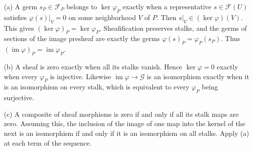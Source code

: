 (a) A germ $s_P\in\mathscr F_P$ belongs to $\ker\varphi_P$ exactly when a representative $s\in\mathscr F(U)$ satisfies $\varphi(s)|_V=0$ on some neighborhood $V$ of $P$. Then $s|_V\in(\ker\varphi)(V)$. This gives $(\ker\varphi)_P=\ker\varphi_P$. Sheafification preserves stalks, and the germs of sections of the image presheaf are exactly the germs $\varphi(s)_P=\varphi_P(s_P)$. Thus $(\operatorname{im}\varphi)_P=\operatorname{im}\varphi_P$.

(b) A sheaf is zero exactly when all its stalks vanish. Hence $\ker\varphi=0$ exactly when every $\varphi_P$ is injective. Likewise $\operatorname{im}\varphi\to\mathscr G$ is an isomorphism exactly when it is an isomorphism on every stalk, which is equivalent to every $\varphi_P$ being surjective.

(c) A composite of sheaf morphisms is zero if and only if all its stalk maps are zero. Assuming this, the inclusion of the image of one map into the kernel of the next is an isomorphism if and only if it is an isomorphism on all stalks. Apply (a) at each term of the sequence.
